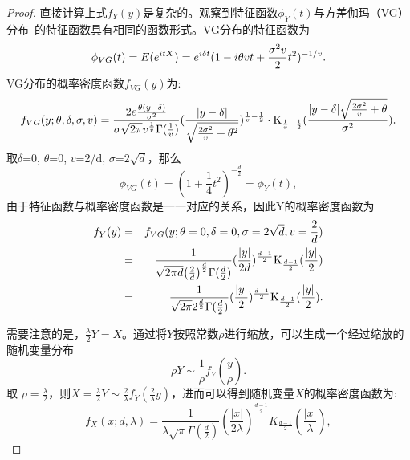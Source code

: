 \begin{proof}
\par
直接计算上式${f_Y}(y)$是复杂的。观察到特征函数${\phi_Y}(t)$与方差伽玛（VG）分布~\cite{Madan:1990:Business,Senata:2004:ApplyPro}的特征函数具有相同的函数形式。VG分布的特征函数为
\begin{equation}
	{\phi _{VG}}(t) = E({e^{itX}}) = {e^{i\delta t}}{(1 - i\theta vt + \frac{{{\sigma ^2}v}}{2}{t^2})^{ - {1 \mathord{\left/
					{\vphantom {1 v}} \right.
					\kern-\nulldelimiterspace} v}}}.
\end{equation}
VG分布的概率密度函数${f_{VG}}(y)$为:
\begin{equation}
	\begin{aligned}
		{f_{VG}}(y;\theta ,\delta ,\sigma ,v) = \frac{{2e\frac{{\theta (y - \delta )}}{{{\sigma ^2}}}}}{{\sigma \sqrt {2\pi } {v^{\frac{1}{v}}}\Gamma (\frac{1}{v})}}{(\frac{{|y - \delta |}}{{\sqrt {\frac{{2{\sigma ^2}}}{v} + {\theta ^2}} }})^{\frac{1}{v} - \frac{1}{2}}}
		\cdot {{\rm K}_{\frac{1}{v} - \frac{1}{2}}}(\frac{{|y - \delta |\sqrt {\frac{{2{\sigma ^2}}}{v} + \theta } }}{{{\sigma ^2}}}).
	\end{aligned}
\end{equation}
取$\delta$=0, $\theta $=0, $v$=2/d, $\sigma$=$2\sqrt d$，那么
\begin{equation}
	{\phi _{VG}}(t) = {(1 + \frac{1}{4}{t^2})^{ - \frac{d}{2}}} = {\phi _Y}(t),
\end{equation}
由于特征函数与概率密度函数是一一对应的关系，因此Y的概率密度函数为
\begin{eqnarray}
		{f_Y}(y) &=& {f_{VG}}(y;\theta  = 0,\delta  = 0,\sigma  = 2\sqrt d ,v = \frac{2}{d})\nonumber\\
		& =& \frac{1}{{\sqrt {2\pi d} {{\left( {\frac{2}{d}} \right)}^{\frac{d}{2}}}\Gamma (\frac{d}{2})}}{(\frac{{|y|}}{{2d}})^{\frac{{d - 1}}{2}}}{{\rm K}_{\frac{{d - 1}}{2}}}(\frac{{|y|}}{2})\nonumber\\
		& =& \frac{1}{{\sqrt {2\pi } {2^{\frac{d}{2}}}\Gamma (\frac{d}{2})}}{(\frac{{|y|}}{2})^{\frac{{d - 1}}{2}}}{{\rm K}_{\frac{{d - 1}}{2}}}(\frac{{|y|}}{2}).
\end{eqnarray}

\par
需要注意的是，$\frac{{{\lambda }}}{2}Y = X$。通过将$Y$按照常数$\rho$进行缩放，可以生成一个经过缩放的随机变量分布
\begin{equation}
	\rho Y \sim \frac{1}{\rho }{f_Y}(\frac{y}{\rho }).
\end{equation}
取 $\rho  = \frac{{{\lambda  }}}{2}$，则$X = \frac{{{\lambda }}}{2}Y \sim \frac{2}{{{\lambda }}}{f_Y}(\frac{2}{{{\lambda }}}y)$，进而可以得到随机变量$X$的概率密度函数为:
\begin{equation}
	f_{X}(x; d, \lambda) = \frac{1}{\lambda \sqrt{\pi} \Gamma(\frac{d}{2})}\left(\frac{|x|}{2\lambda} \right)^{\frac{d-1}{2}}K_{\frac{d-1}{2}}\left(\frac{|x|}{\lambda}\right),
\end{equation}
\end{proof}
